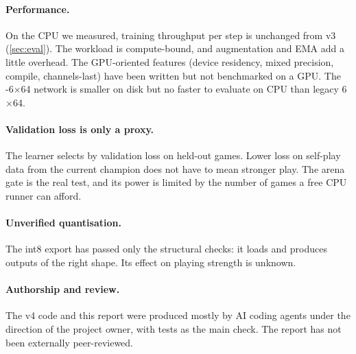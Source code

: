 \paragraph{Performance.}
On the CPU we measured, training throughput per step is unchanged from v3
(\cref{sec:eval}). The workload is compute-bound, and augmentation and EMA add a little
overhead. The GPU-oriented features (device residency, mixed precision, compile,
channels-last) have been written but not benchmarked on a GPU. The -6$\times$64
network is smaller on disk but no faster to evaluate on CPU than legacy 6$\times$64.

\paragraph{Validation loss is only a proxy.}
The learner selects  by validation loss on held-out games. Lower loss on
self-play data from the current champion does not have to mean stronger play. The arena
gate is the real test, and its power is limited by the number of games a free CPU runner
can afford.

\paragraph{Unverified quantisation.}
The int8 export has passed only the structural checks: it loads and produces outputs of
the right shape. Its effect on playing strength is unknown.

\paragraph{Authorship and review.}
The v4 code and this report were produced mostly by AI coding agents under the direction
of the project owner, with tests as the main check. The report has not been externally
peer-reviewed.
